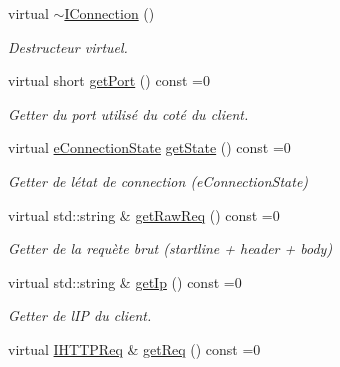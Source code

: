 \begin{DoxyCompactItemize}
\item 
\hypertarget{class_a_p_i_tree_friends_1_1_i_connection_a4f7e27da80c02f008e355166293c7068}{}virtual \hyperlink{class_a_p_i_tree_friends_1_1_i_connection_a4f7e27da80c02f008e355166293c7068}{$\sim$\+I\+Connection} ()\label{class_a_p_i_tree_friends_1_1_i_connection_a4f7e27da80c02f008e355166293c7068}

\begin{DoxyCompactList}\small\item\em Destructeur virtuel. \end{DoxyCompactList}\item 
virtual short \hyperlink{class_a_p_i_tree_friends_1_1_i_connection_aadcbd2640a8a3b9d4fdf376943c2b070}{get\+Port} () const =0
\begin{DoxyCompactList}\small\item\em Getter du port utilisé du coté du client. \end{DoxyCompactList}\item 
virtual \hyperlink{namespace_a_p_i_tree_friends_a746fed077303e8587bfa0e8f2dbf4997}{e\+Connection\+State} \hyperlink{class_a_p_i_tree_friends_1_1_i_connection_a6d0360981f75fbab7f45c2816b74d7c0}{get\+State} () const =0
\begin{DoxyCompactList}\small\item\em Getter de l\textquotesingle{}état de connection (e\+Connection\+State) \end{DoxyCompactList}\item 
virtual std\+::string \& \hyperlink{class_a_p_i_tree_friends_1_1_i_connection_aebde1da91e09e51a4c8827ee30ccf32f}{get\+Raw\+Req} () const =0
\begin{DoxyCompactList}\small\item\em Getter de la requète brut (startline + header + body) \end{DoxyCompactList}\item 
virtual std\+::string \& \hyperlink{class_a_p_i_tree_friends_1_1_i_connection_ae94c91d10b9ebb3b5627e18d79836b78}{get\+Ip} () const =0
\begin{DoxyCompactList}\small\item\em Getter de l\textquotesingle{}I\+P du client. \end{DoxyCompactList}\item 
virtual \hyperlink{class_a_p_i_tree_friends_1_1_i_h_t_t_p_req}{I\+H\+T\+T\+P\+Req} \& \hyperlink{class_a_p_i_tree_friends_1_1_i_connection_a40ab190c237fadebcff0fd5366a1e07e}{get\+Req} () const =0

\end{DoxyCompactItemize}
